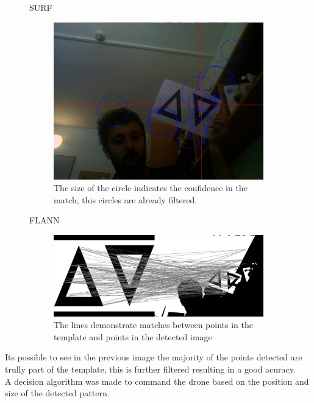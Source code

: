 \documentclass[pdf]{beamer}
\begin{document}
\begin{frame}
\begin{figure}[hbtp]
  \centering
SURF\\
\begin{subfigure}{0.80\textwidth}
  \centering
  \includegraphics[width=1.0\linewidth]{image_marked.jpg}\\
  The size of the circle indicates the confidence in the match, this circles are
already filtered.
\end{subfigure}
\end{figure}
\end{frame}

\begin{frame}
\begin{figure}[hbtp]
  \centering
FLANN
\begin{subfigure}{1.00\textwidth}
  \centering
  \includegraphics[width=1.00\linewidth]{matches.jpg}\\
The lines demonstrate matches between points in the template and points in the
detected image
\end{subfigure}
\end{figure}
\end{frame}
\begin{frame}
Its possible to see in the previous image the majority of the points detected
are trully part of the template, this is further filtered resulting in a good
acuracy.\\
A decision algorithm was made to command the drone based on the position and
size of the detected pattern.
\end{frame}
\end{document}
